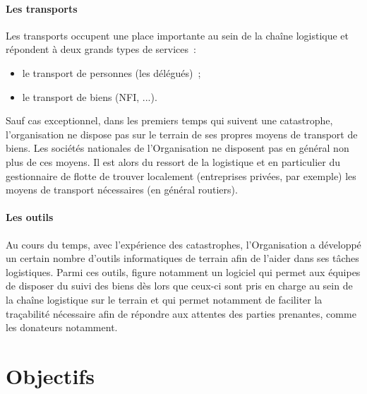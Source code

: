 \paragraph{Les transports}
Les transports occupent une place importante au sein de la chaîne logistique et répondent à deux grands types de services~:
\begin{itemize}
	\item le transport de personnes (les délégués)~;
	\item le transport de biens (NFI, ...).
\end{itemize}
Sauf cas exceptionnel, dans les premiers temps qui suivent une catastrophe, l'organisation ne dispose pas sur le terrain de ses propres moyens de transport de biens.
Les sociétés nationales de l'Organisation ne disposent pas en général non plus de ces moyens.
Il est alors du ressort de la logistique et en particulier du gestionnaire de flotte de trouver localement (entreprises privées, par exemple) les moyens de transport nécessaires (en général routiers).

\paragraph{Les outils}
Au cours du temps, avec l'expérience des catastrophes, l'Organisation a développé un certain nombre d'outils informatiques de terrain afin de l'aider dans ses tâches logistiques.
Parmi ces outils, figure notamment un logiciel qui permet aux équipes de disposer du suivi des biens dès lors que ceux-ci sont pris en charge au sein de la chaîne logistique sur le terrain et qui permet notamment de faciliter la traçabilité nécessaire afin de répondre aux attentes des parties prenantes, comme les donateurs notamment.

\section{Objectifs}

